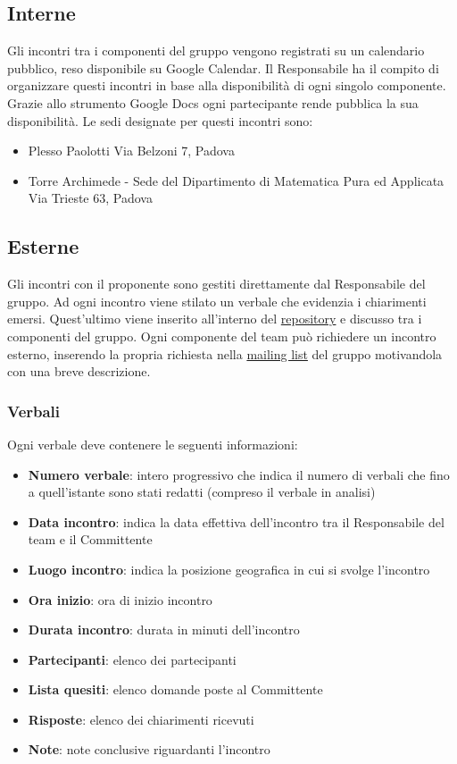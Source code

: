 \documentclass[a4paper,11pt]{article}
\begin{document}
\subsection{Interne}
Gli incontri tra i componenti del gruppo vengono registrati su un calendario pubblico, reso disponibile su Google Calendar. Il Responsabile ha il compito di organizzare questi incontri in base alla disponibilit\`a di ogni singolo componente. Grazie allo strumento Google Docs ogni partecipante rende pubblica la sua disponibilit\`a. Le sedi designate per questi incontri sono:
\begin{itemize}
\item Plesso Paolotti Via Belzoni 7, Padova
\item Torre Archimede - Sede del Dipartimento di Matematica Pura ed Applicata Via Trieste 63, Padova
\end{itemize} 
\subsection{Esterne}
Gli incontri con il proponente sono gestiti direttamente dal Responsabile del gruppo. Ad ogni incontro viene stilato un verbale che evidenzia i chiarimenti emersi. Quest'ultimo viene inserito all'interno del \underline{repository} e discusso tra i componenti del gruppo. Ogni componente del team pu\`o richiedere un incontro esterno, inserendo la propria richiesta nella \underline{mailing list} del gruppo motivandola con una breve descrizione.
\subsubsection{Verbali}
Ogni verbale deve contenere le seguenti informazioni:
\begin{itemize}
\item \textbf{Numero verbale}: intero progressivo che indica il numero di verbali che fino a quell'istante sono stati redatti (compreso il verbale in analisi)
\item \textbf{Data incontro}: indica la data effettiva dell'incontro tra il Responsabile del team e il Committente
\item \textbf{Luogo incontro}: indica la posizione geografica in cui si svolge l'incontro
\item \textbf{Ora inizio}: ora di inizio incontro
\item \textbf{Durata incontro}: durata in minuti dell'incontro
\item \textbf{Partecipanti}: elenco dei partecipanti
\item \textbf{Lista quesiti}: elenco domande poste al Committente
\item \textbf{Risposte}: elenco dei chiarimenti ricevuti
\item \textbf{Note}: note conclusive riguardanti l'incontro
\end{itemize} 
\end{document}
